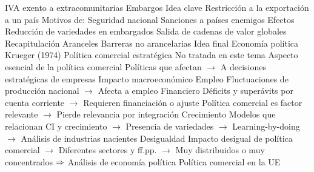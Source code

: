 \documentclass{nuevotema}
\begin{document}
\begin{esquemal}
				\4[] IVA exento a extracomunitarias
		\2 Embargos
			\3 Idea clave
				\4 Restricción a la exportación a un país
				\4 Motivos de:
				\4[] Seguridad nacional
				\4[] Sanciones a países enemigos
			\3 Efectos
				\4 Reducción de variedades en embargados
				\4 Salida de cadenas de valor globales
	\1 
		\2 Recapitulación
			\3 Aranceles
			\3 Barreras no arancelarias
		\2 Idea final
			\3 Economía política
				\4 Krueger (1974)
			\3 Política comercial estratégica
				\4 No tratada en este tema
				\4 Aspecto esencial de la política comercial
				\4[] Políticas que afectan
				\4[] $\to$ A decisiones estratégicas de empresas
			\3 Impacto macroeconómico
				\4 Empleo
				\4[] Fluctuaciones de producción nacional
				\4[] $\to$ Afecta a empleo
				\4 Financiero
				\4[] Déficits y superávits por cuenta corriente
				\4[] $\to$ Requieren financiación o ajuste
				\4[] Política comercial es factor relevante
				\4[] $\to$ Pierde relevancia por integración
				\4 Crecimiento
				\4[] Modelos que relacionan CI y crecimiento
				\4[] $\to$ Presencia de variedades
				\4[] $\to$ Learning-by-doing
				\4[] $\to$ Análisis de industrias nacientes
				\4 Desigualdad
				\4[] Impacto desigual de política comercial
				\4[] $\to$ Diferentes sectores y ff.pp.
				\4[] $\to$ Muy distribuidos o muy concentrados
				\4[] $\Rightarrow$ Análisis de economía política
			\3 Política comercial en la UE
\end{esquemal}















\graficas
\end{document}
